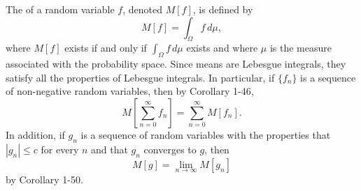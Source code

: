 The  of a random variable $f$, denoted $M[f]$, is defined by
$$M[f] = \int_{\Omega} f \, d\mu,$$
where $M[f]$ exists if and only if $\int_{\Omega} f \, d\mu$ exists and where $\mu$ is the measure associated with the probability space. Since means are Lebesgue integrals, they satisfy all the properties of Lebesgue integrals. In particular, if $\{f_n\}$ is a sequence of non-negative random variables, then by Corollary 1-46,
$$M\left[\sum_{n=0}^{\infty} f_n\right] = \sum_{n=0}^{\infty} M[f_n].$$
In addition, if $g_n$ is a sequence of random variables with the properties that $|g_n| \leq c$ for every $n$ and that $g_n$ converges to $g$, then
$$M[g] = \lim_{n \to \infty} M[g_n]$$
by Corollary 1-50.
